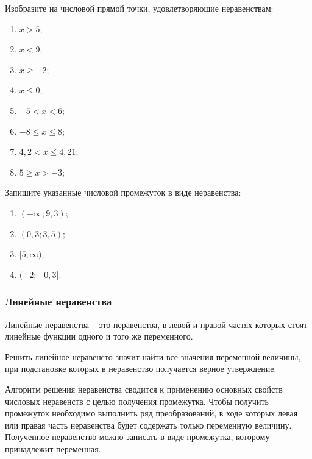 \documentclass[algebra,twocolumn]{pum}
\renewcommand\le\leqslant
\renewcommand\ge\geqslant
\begin{document}
\begin{exercises}
  \begin{question}
    Изобразите на числовой прямой точки, удовлетворяющие неравенствам:
    \begin{multicols}{2}
      \begin{enumerate}[label=\arabic*),nosep]
        \item $x>5$;
        \item $x<9$;
        \item $x\ge -2$;
        \item $x\le 0$;
        \item $-5<x<6$;
        \item $-8\le x\le 8$;
        \item $4,2<x\le 4,21$;
        \item $5\ge x>-3$;
      \end{enumerate}
    \end{multicols}
  \end{question}
  \begin{question}
    Запишите указанные числовой промежуток в виде неравенства:
    \begin{multicols}{2}
      \begin{enumerate}[label=\arabic*),nosep]

        \item $(-\infty;9,3)$;
        \item $(0,3;3,5)$;
        \item $[5;\infty)$;
        \item $(-2;-0,3]$.
      \end{enumerate}
    \end{multicols}
  \end{question}
\end{exercises}

\subsubsection*{Линейные неравенства}
Линейные неравенства -- это неравенства, в левой и правой частях которых стоят линейные функции одного и того же переменного.

Решить линейное неравенсто значит найти все значения переменной величины, при подстановке которых в неравенство получается верное утверждение.

Алгоритм решения неравенства сводится к применению основных свойств числовых неравенств с целью получения промежутка. Чтобы получить промежуток необходимо выполнить ряд преобразований, в ходе которых левая или правая часть неравенства будет содержать только переменную величину. Полученное неравенство можно записать в виде промежутка, которому принадлежит переменная.
\end{document}
